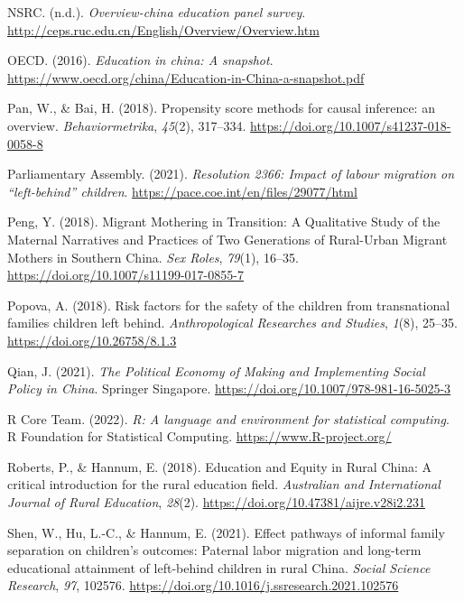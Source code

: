 \documentclass[
  man,floatsintext]{apa7}
\newlength{\cslhangindent}
\newlength{\cslentryspacingunit} %
\newenvironment{CSLReferences}[2] %
 {%
  \setlength{\parindent}{0pt}
  \ifodd #1
  \let\oldpar\par
  \def\par{\hangindent=\cslhangindent\oldpar}
  \fi
  \setlength{\parskip}{#2\cslentryspacingunit}
 }%
 {}
\begin{document}
\begin{CSLReferences}{1}{0}
\leavevmode{}%
NSRC. (n.d.). \emph{Overview-china education panel survey}. \url{http://ceps.ruc.edu.cn/English/Overview/Overview.htm}

\leavevmode{}%
OECD. (2016). \emph{Education in china: A snapshot}. \url{https://www.oecd.org/china/Education-in-China-a-snapshot.pdf}

\leavevmode{}%
Pan, W., \& Bai, H. (2018). Propensity score methods for causal inference: an overview. \emph{Behaviormetrika}, \emph{45}(2), 317--334. \url{https://doi.org/10.1007/s41237-018-0058-8}

\leavevmode{}%
Parliamentary Assembly. (2021). \emph{Resolution 2366: Impact of labour migration on {``}left-behind{''} children}. \url{https://pace.coe.int/en/files/29077/html}

\leavevmode{}%
Peng, Y. (2018). Migrant Mothering in Transition: A Qualitative Study of the Maternal Narratives and Practices of Two Generations of Rural-Urban Migrant Mothers in Southern China. \emph{Sex Roles}, \emph{79}(1), 16--35. \url{https://doi.org/10.1007/s11199-017-0855-7}

\leavevmode{}%
Popova, A. (2018). Risk factors for the safety of the children from transnational families children left behind. \emph{Anthropological Researches and Studies}, \emph{1}(8), 25--35. \url{https://doi.org/10.26758/8.1.3}

\leavevmode{}%
Qian, J. (2021). \emph{The Political Economy of Making and Implementing Social Policy in China}. Springer Singapore. \url{https://doi.org/10.1007/978-981-16-5025-3}

\leavevmode{}%
R Core Team. (2022). \emph{R: A language and environment for statistical computing}. R Foundation for Statistical Computing. \url{https://www.R-project.org/}

\leavevmode{}%
Roberts, P., \& Hannum, E. (2018). Education and Equity in Rural China: A critical introduction for the rural education field. \emph{Australian and International Journal of Rural Education}, \emph{28}(2). \url{https://doi.org/10.47381/aijre.v28i2.231}

\leavevmode{}%
Shen, W., Hu, L.-C., \& Hannum, E. (2021). Effect pathways of informal family separation on children's outcomes: Paternal labor migration and long-term educational attainment of left-behind children in rural China. \emph{Social Science Research}, \emph{97}, 102576. \url{https://doi.org/10.1016/j.ssresearch.2021.102576}


\end{CSLReferences}
\end{document}
